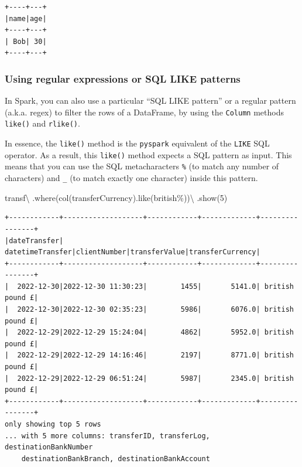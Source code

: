 \documentclass[
  11pt,
  letterpaper,
  DIV=11,
  numbers=noendperiod]{scrreprt}
\newenvironment{Shaded}{\begin{snugshade}}{\end{snugshade}}
\newcommand{\DecValTok}[1]{\textcolor[rgb]{0.68,0.00,0.00}{#1}}
\newcommand{\NormalTok}[1]{\textcolor[rgb]{0.00,0.23,0.31}{#1}}
\newcommand{\OperatorTok}[1]{\textcolor[rgb]{0.37,0.37,0.37}{#1}}
\newcommand{\StringTok}[1]{\textcolor[rgb]{0.13,0.47,0.30}{#1}}
\begin{document}
\begin{verbatim}
+----+---+
|name|age|
+----+---+
| Bob| 30|
+----+---+
\end{verbatim}

\hypertarget{sec-filter-regex-pattern}{%
\subsubsection{Using regular expressions or SQL LIKE
patterns}\label{sec-filter-regex-pattern}}

In Spark, you can also use a particular ``SQL LIKE pattern'' or a
regular pattern (a.k.a. regex) to filter the rows of a DataFrame, by
using the \texttt{Column} methods \texttt{like()} and \texttt{rlike()}.

In essence, the \texttt{like()} method is the \texttt{pyspark}
equivalent of the \texttt{LIKE} SQL operator. As a result, this
\texttt{like()} method expects a SQL pattern as input. This means that
you can use the SQL metacharacters \texttt{\%} (to match any number of
characters) and \texttt{\_} (to match exactly one character) inside this
pattern.

\begin{Shaded}
\begin{Highlighting}[]
\NormalTok{transf}\OperatorTok{\textbackslash{}}
\NormalTok{  .where(col(}\StringTok{\textquotesingle{}transferCurrency\textquotesingle{}}\NormalTok{).like(}\StringTok{\textquotesingle{}british\%\textquotesingle{}}\NormalTok{))}\OperatorTok{\textbackslash{}}
\NormalTok{  .show(}\DecValTok{5}\NormalTok{)}
\end{Highlighting}
\end{Shaded}

\begin{verbatim}
+------------+-------------------+------------+-------------+----------------+
|dateTransfer|   datetimeTransfer|clientNumber|transferValue|transferCurrency|
+------------+-------------------+------------+-------------+----------------+
|  2022-12-30|2022-12-30 11:30:23|        1455|       5141.0| british pound £|
|  2022-12-30|2022-12-30 02:35:23|        5986|       6076.0| british pound £|
|  2022-12-29|2022-12-29 15:24:04|        4862|       5952.0| british pound £|
|  2022-12-29|2022-12-29 14:16:46|        2197|       8771.0| british pound £|
|  2022-12-29|2022-12-29 06:51:24|        5987|       2345.0| british pound £|
+------------+-------------------+------------+-------------+----------------+
only showing top 5 rows
... with 5 more columns: transferID, transferLog, destinationBankNumber
    destinationBankBranch, destinationBankAccount
\end{verbatim}
\end{document}

